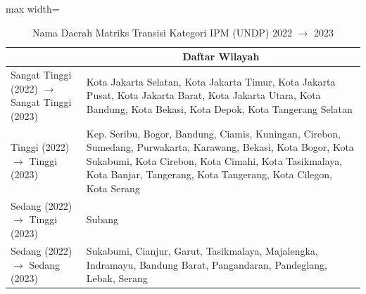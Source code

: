 \begin{table}[H]
\centering
\caption{Nama Daerah Matriks Transisi Kategori IPM (UNDP) 2022 \(\rightarrow\) 2023} \label{tab:app1ipmname2022x2023}
\begin{adjustbox}{max width=\textwidth}
\begin{tabular}{|>{\centering\arraybackslash}p{4cm}|p{10cm}|}
\hline
\multicolumn{1}{|c|}{\textbf{Kategori}} & \multicolumn{1}{c|}{\textbf{Daftar Wilayah}} \\
\hline
Sangat Tinggi (2022) \(\rightarrow\) Sangat Tinggi (2023) & Kota Jakarta Selatan, Kota Jakarta Timur, Kota Jakarta Pusat, Kota Jakarta Barat, Kota Jakarta Utara, Kota Bandung, Kota Bekasi, Kota Depok, Kota Tangerang Selatan \\
\hline
Tinggi (2022) \(\rightarrow\) Tinggi (2023) & Kep. Seribu, Bogor, Bandung, Ciamis, Kuningan, Cirebon, Sumedang, Purwakarta, Karawang, Bekasi, Kota Bogor, Kota Sukabumi, Kota Cirebon, Kota Cimahi, Kota Tasikmalaya, Kota Banjar, Tangerang, Kota Tangerang, Kota Cilegon, Kota Serang \\
\hline
Sedang (2022) \(\rightarrow\) Tinggi (2023) & Subang \\
\hline
Sedang (2022) \(\rightarrow\) Sedang (2023) & Sukabumi, Cianjur, Garut, Tasikmalaya, Majalengka, Indramayu, Bandung Barat, Pangandaran, Pandeglang, Lebak, Serang \\
\hline
\end{tabular}
\end{adjustbox}
\end{table}